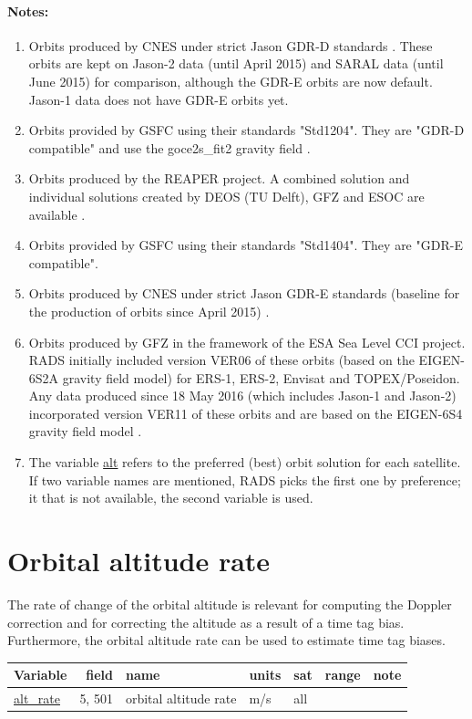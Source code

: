 \documentclass[a4paper,11pt,openany,natbib,nomargin]{thesis}
\makeatletter
\newcommand\var[1]{\url{#1}\index{variables!#1@\protect\url{#1}}}
\newenvironment{vartable}{
\begin{table}[ht]
\small
\begin{tabular}{lrllllr}
\hline
Variable & field & name & units & sat & range & note \\
\hline
}{
\hline
\end{tabular}
\end{table}
}
\newenvironment{notes}[1][Notes:]{\FloatBarrier\paragraph{#1}\begin{enumerate}}{\end{enumerate}}
\makeatother
\begin{document}
\begin{notes}
\item Orbits produced by CNES under strict Jason GDR-D standards \citep{ids2011}. These orbits are kept on Jason-2 data (until April 2015) and SARAL data (until June 2015) for comparison, although the GDR-E orbits are now default. Jason-1 data does not have GDR-E orbits yet.\label{item:alt_gdrd}
\item Orbits provided by GSFC using their standards "Std1204". They are "GDR-D compatible" and use the goce2s\_fit2 gravity field \citep{lemoine2013}.\label{item:alt_std1204}
\item Orbits produced by the REAPER project. A combined solution and individual solutions created by DEOS (TU Delft), GFZ and ESOC are available \citep{rudenko2011}.\label{item:alt_reaper}
\item Orbits provided by GSFC using their standards "Std1404". They are "GDR-E compatible".\label{item:alt_std1404}
\item Orbits produced by CNES under strict Jason GDR-E standards (baseline for the production of orbits since April 2015) \citep{ids2015}.\label{item:alt_gdre}
\item Orbits produced by GFZ in the framework of the ESA Sea Level CCI project. RADS initially included version VER06 of these orbits (based on the EIGEN-6S2A gravity field model) \citep{rudenko2014} for ERS-1, ERS-2, Envisat and TOPEX/Poseidon. Any data produced since 18 May 2016 (which includes Jason-1 and Jason-2) incorporated version VER11 of these orbits and are based on the EIGEN-6S4 gravity field model \citep{rudenko2015,rudenko2016}.\label{item:alt_slcci}
\item The variable \var{alt} refers to the preferred (best) orbit solution for each satellite. If two variable names are mentioned, RADS picks the first one by preference; it that is not available, the second variable is used.\label{item:alt}
\end{notes}

\section{Orbital altitude rate}
The rate of change of the orbital altitude is relevant for computing the Doppler correction and for correcting the altitude as a result of a time tag bias. Furthermore, the orbital altitude rate can be used to estimate time tag biases.

\begin{vartable}
\var{alt_rate} & 5, 501 & orbital altitude rate & m/s & all && \\
\end{vartable}
\end{document}
